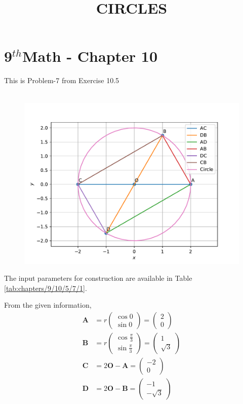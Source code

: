 \documentclass[10pt]{article}
\newcommand{\myvec}[1]{\ensuremath{\begin{pmatrix}#1\end{pmatrix}}}
\let\vec\mathbf{}
\begin{document}
\begin{center}
\title{\textbf{CIRCLES}}
\date{\vspace{-5ex}}
\maketitle
\end{center}
\section*{9$^{th}$Math - Chapter 10}
This is Problem-7 from Exercise 10.5\\\\
\fi
\begin{figure}[!ht]
	\begin{center}
		\includegraphics[width=\columnwidth]{./chapters/9/10/5/7/figs/fig.pdf}
	\end{center}
\caption{}
\label{fig:chapters/9/10/5/7/1}
\end{figure}
The input parameters for construction
are available in Table
	\ref{tab:chapters/9/10/5/7/1}.
\begin{table}[ht!]
	\centering
     
	\label{tab:chapters/9/10/5/7/1}
\end{table}
From the given information,
\begin{align}
	\vec{A}&=r\myvec{\cos0\\ \sin0}=\myvec{2\\0}\\
	\vec{B}&=r\myvec{\cos\frac{\pi}{3}\\ \sin\frac{\pi}{3}}=\myvec{1\\\sqrt{3}}\\
	\vec{C}&=2\vec{O}-\vec{A}=\myvec{-2\\0}\\
	\vec{D}&=2\vec{O}-\vec{B}=\myvec{-1\\-\sqrt{3}}
\end{align}
\end{document}
